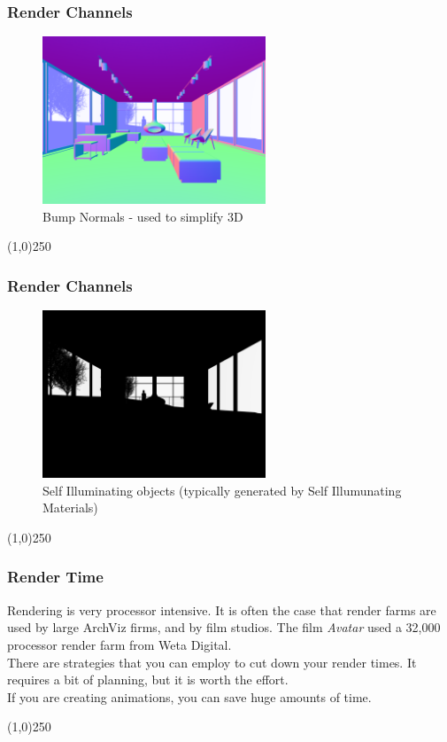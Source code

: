 \begin{frame}
\frametitle{Render Channels}
\begin{figure}
	\centering
	\includegraphics[height=5cm]{./img/Rendering/SittingRoomFinalBump_Normal.png}
	\caption[Bump Normals - used to simplify 3D]{Bump Normals - used to simplify 3D}
	\label{fig:sittingroomfinalBumpNormal}
\end{figure}
\end{frame}
\begin{center}\line(1,0){250}\end{center}

\begin{frame}
\frametitle{Render Channels}
\begin{figure}
	\centering
	\includegraphics[height=5cm]{./img/Rendering/SittingRoomFinalSelf_Illumination.png}
	\caption[Self Illuminating objects (typically generated by Self Illumunating Materials)]{Self Illuminating objects (typically generated by Self Illumunating Materials)}
	\label{fig:sittingroomfinalSelfIllumination}
\end{figure}
\end{frame}
\begin{center}\line(1,0){250}\end{center}







\begin{frame}
	\frametitle{Render Time}
	Rendering is very processor intensive.  It is often the case that render farms are used by large ArchViz firms, and by film studios.  The film \textit{Avatar} used a 32,000 processor render farm from Weta Digital.\\
	There are strategies that you can employ to cut down your render times.  It requires a bit of planning, but it is worth the effort.\\
	If you are creating animations, you can save huge amounts of time.
	
\end{frame}
\begin{center}\line(1,0){250}\end{center}


